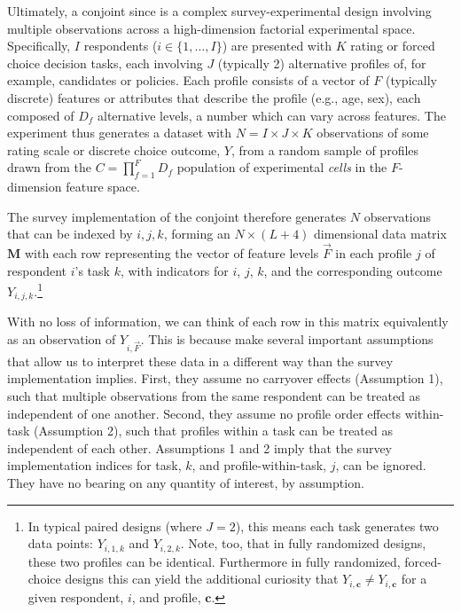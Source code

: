 \documentclass[a4paper,12pt]{article}\usepackage[]{graphicx}\usepackage[]{color}
\begin{document}
Ultimately, a conjoint since \citet{HainmuellerHopkinsYamamoto2014} is a complex survey-experimental design involving multiple observations across a high-dimension factorial experimental space. Specifically, $I$ respondents ($i \in \{1, \dots, I\}$) are presented with $K$ rating or forced choice decision tasks, each involving $J$ (typically 2) alternative profiles of, for example, candidates or policies. Each profile consists of a vector of $F$ (typically discrete) features or attributes that describe the profile (e.g., age, sex), each composed of $D_f$ alternative levels, a number which can vary across features. The experiment thus generates a dataset with $N = I \times J \times K$ observations of some rating scale or discrete choice outcome, $Y$, from a random sample of profiles drawn from the $C = \prod_{f = 1}^{F} D_f$ population of experimental \textit{cells} in the $F$-dimension feature space.

The survey implementation of the conjoint therefore generates $N$ observations that can be indexed by $i,j,k$, forming an $N \times(L+4)$ dimensional data matrix $\mathbf{M}$ with each row representing the vector of feature levels $\vec{F}$ in each profile $j$ of respondent $i$'s task $k$, with indicators for $i$, $j$, $k$, and the corresponding outcome $Y_{i,j,k}$.\footnote{In typical paired designs (where $J=2$), this means each task generates two data points: $Y_{i,1,k}$ and $Y_{i,2,k}$. Note, too, that in fully randomized designs, these two profiles can be identical. Furthermore in fully randomized, forced-choice designs this can yield the additional curiosity that $Y_{i,\mathbf{c}} \neq Y_{i,\mathbf{c}}$ for a given respondent, $i$, and profile, $\mathbf{c}$.}

With no loss of information, we can think of each row in this matrix equivalently as an observation of $Y_{i,\vec{F}}$. This is because \citet{HainmuellerHopkinsYamamoto2014} make several important assumptions that allow us to interpret these data in a different way than the survey implementation implies. First, they assume no carryover effects (Assumption 1), such that multiple observations from the same respondent can be treated as independent of one another. Second, they assume no profile order effects within-task (Assumption 2), such that profiles within a task can be treated as independent of each other. Assumptions 1 and 2 imply that the survey implementation indices for task, $k$, and profile-within-task, $j$, can be ignored. They have no bearing on any quantity of interest, by assumption. 
\end{document}
